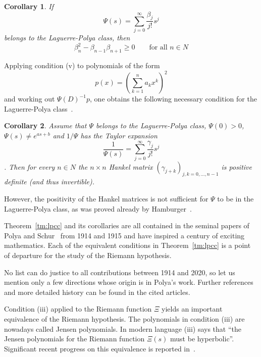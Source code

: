 \documentclass{article}
\newtheorem{corollary}{Corollary}
\providecommand{\*}{{\opl}}
\newcommand{\field}[1]{#1}
\newcommand{\bN}{\field{N}}
\newcommand{\<}{}
\newcommand{\>}{}
\newcommand{\inv}{^{- 1}}
\newcommand{\lpc}{Laguerre-Polya class}
\begin{document}
\begin{corollary}
  \label{turan}If
  \begin{equation}
    \Psi (s) = \sum_{j = 0}^{\infty} \frac{\beta_j}{j!} s^j
  \end{equation}
  belongs to the {\lpc}, then
  \[ \beta_n^2 - \beta_{n - 1} \beta_{n + 1} \geq 0 \qquad \text{for all } n
     \in \bN \]
\end{corollary}

Applying condition (v) to polynomials of the form
\begin{equation}
  p (x) = \left( \sum_{k = 1}^n a_k x^k \right)^2
\end{equation}
and working out $\Psi (D) \inv p$, one obtains the following necessary
condition for the {\lpc}~{\cite[p.~235]{Pol15}}.

\begin{corollary}
  \label{hankel}Assume that $\Psi$ belongs to the {\lpc}, $\Psi (0) > 0$,
  $\Psi (s) \neq e^{as + b}$ and $1 / \Psi$ has the Taylor expansion
  \begin{equation}
    \frac{1}{\Psi (s)} = \sum_{j = 0}^{\infty} \frac{\gamma_j}{j!} s^j
  \end{equation}
  . Then for every $n \in \bN$ the $n \times n$ Hankel matrix $(\gamma_{j +
  k})_{j, k = 0, \ldots, n - 1}$ is positive definite (and thus invertible).
\end{corollary}

However, the positivity of the Hankel matrices is not sufficient for $\Psi$ to
be in the {\lpc}, as was proved already by Hamburger~{\cite{Ham20}}.

Theorem~\ref{tm:lpcc} and its corollaries are all contained in the seminal
papers of Polya and Schur~{\cite{Pol15,PS1914}} from 1914 and 1915 and have
inspired a century of exciting mathematics. Each of the equivalent conditions
in Theorem~\ref{tm:lpcc} is a point of departure for the study of the Riemann
hypothesis.

No list can do justice to all contributions between 1914 and 2020, so let us
mention only a few directions whose origin is in Polya's work. Further
references and more detailed history can be found in the cited articles.

Condition (iii) applied to the Riemann function $\Xi$ yields an important
equivalence of the Riemann hypothesis. The polynomials in condition (iii) are
nowadays called Jensen polynomials. In modern language (iii) says that ``the
Jensen polynomials for the Riemann function $\Xi (s)$ must be hyperbolic''.
Significant recent progress on this equivalence is reported in~{\cite{GORZ}}.
\end{document}

